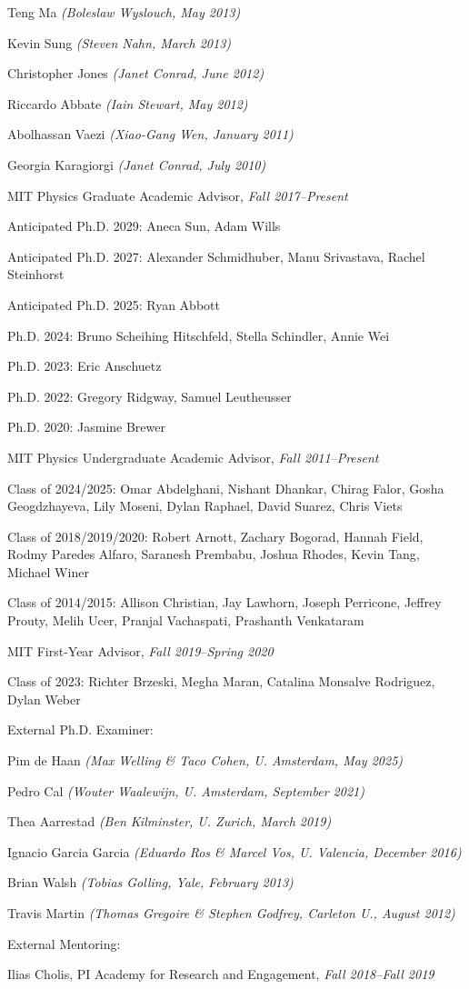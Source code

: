 \item Teng Ma \textit{(Boleslaw Wyslouch, May 2013)}
\item Kevin Sung \textit{(Steven Nahn, March 2013)}
\item Christopher Jones \textit{(Janet Conrad, June 2012)}
\item Riccardo Abbate \textit{(Iain Stewart, May 2012)}
\item Abolhassan Vaezi \textit{(Xiao-Gang Wen, January 2011)}
\item Georgia Karagiorgi \textit{(Janet Conrad, July 2010)}
\el 
\item MIT Physics Graduate Academic Advisor, \emph{Fall 2017--Present}
\bsbl 
\item Anticipated Ph.D. 2029: Aneca Sun, Adam Wills
\item Anticipated Ph.D. 2027: Alexander Schmidhuber, Manu Srivastava, Rachel Steinhorst
\item Anticipated Ph.D. 2025: Ryan Abbott
\item Ph.D. 2024: Bruno Scheihing Hitschfeld, Stella Schindler, Annie Wei
\item Ph.D. 2023: Eric Anschuetz
\item Ph.D. 2022: Gregory Ridgway, Samuel Leutheusser
\item Ph.D. 2020: Jasmine Brewer
\el 
\item MIT Physics Undergraduate Academic Advisor, \emph{Fall 2011--Present}
\bsbl 
\item Class of 2024/2025: Omar Abdelghani, Nishant Dhankar, Chirag Falor, Gosha Geogdzhayeva, Lily Moseni, Dylan Raphael, David Suarez, Chris Viets
\item Class of 2018/2019/2020: Robert Arnott, Zachary Bogorad, Hannah Field, Rodmy Paredes Alfaro, Saranesh Prembabu, Joshua Rhodes, Kevin Tang, Michael Winer
\item Class of 2014/2015: Allison Christian, Jay Lawhorn, Joseph Perricone, Jeffrey Prouty, Melih Ucer, Pranjal Vachaspati, Prashanth Venkataram
\el 
\item MIT First-Year Advisor, \emph{Fall 2019--Spring 2020}
\bsbl 
\item Class of 2023: Richter Brzeski, Megha Maran, Catalina Monsalve Rodriguez, Dylan Weber
\el 

\item External Ph.D. Examiner:
\bsbl 
\item Pim de Haan \textit{(Max Welling \& Taco Cohen, U. Amsterdam, May 2025)}
\item Pedro Cal \textit{(Wouter Waalewijn, U. Amsterdam, September 2021)}
\item Thea Aarrestad \textit{(Ben Kilminster, U. Zurich, March 2019)}
\item Ignacio Garcia Garcia \textit{(Eduardo Ros \& Marcel Vos, U. Valencia, December 2016)}
\item Brian Walsh \textit{(Tobias Golling, Yale, February 2013)}
\item Travis Martin \textit{(Thomas Gregoire \& Stephen Godfrey, Carleton U., August 2012)}
\el 
\item External Mentoring:
\bsbl 
\item Ilias Cholis, PI Academy for Research and Engagement, \emph{Fall 2018--Fall 2019}
\el 
\el
